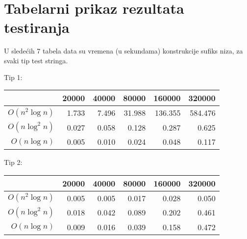 \appendix
\section{Tabelarni prikaz rezultata testiranja}
\label{sirtabele}


U slede\' cih $7$ tabela data su vremena (u sekundama) konstrukcije sufiks niza, za svaki tip test stringa.

Tip 1:

\begin{tabular}{r|r|r|r|r|r}
                & 20000 & 40000 & 80000 & 160000 & 320000 \\
\hline
$O(n^2 \log n)$ & 1.733 & 7.496 & 31.988 & 136.355 & 584.476  \\
\hline
$O(n \log^2 n)$ & 0.027 & 0.058 & 0.128 & 0.287 & 0.625  \\
\hline
$O(n \log n)$ & 0.005 & 0.010 & 0.024 & 0.048 & 0.117  \\
\end{tabular}

Tip 2:

\begin{tabular}{r|r|r|r|r|r}
                & 20000 & 40000 & 80000 & 160000 & 320000 \\
\hline
$O(n^2 \log n)$ & 0.005 & 0.005 & 0.017 & 0.028 & 0.050  \\
\hline
$O(n \log^2 n)$ & 0.018 & 0.042 & 0.089 & 0.202 & 0.461  \\
\hline
$O(n \log n)$ & 0.009 & 0.016 & 0.039 & 0.158 & 0.472  \\
\end{tabular}

